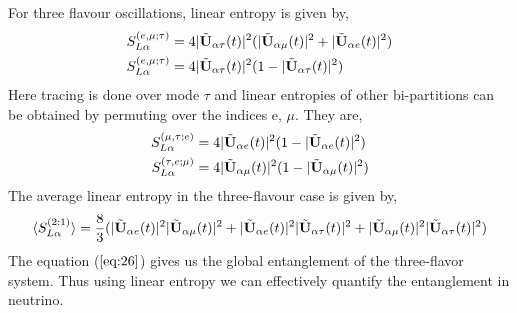 \documentclass[12pt,a4paper]{report}
\begin{document}
For three flavour oscillations, linear entropy is given by,
\begin{equation}
\begin{split}
S_{L\alpha}^{(e,\mu;\tau)}& = 4|\Tilde{\textbf{U}}_{\alpha \tau}(t)|^{2}(|\Tilde{\textbf{U}}_{\alpha \mu}(t)|^{2} + |\Tilde{\textbf{U}}_{\alpha e}(t)|^{2})\\
S_{L\alpha}^{(e,\mu;\tau)}&=  4|\Tilde{\textbf{U}}_{\alpha \tau}(t)|^{2}(1-|\Tilde{\textbf{U}}_{\alpha \tau}(t)|^{2})
\end{split}
\end{equation}
Here tracing is done over mode $\tau$ and linear entropies of other bi-partitions can be obtained by permuting over the indices e, $\mu$. They are, 
\begin{equation}
\begin{split}
S_{L\alpha}^{(\mu,\tau;e)}&=  4|\Tilde{\textbf{U}}_{\alpha e}(t)|^{2}(1-|\Tilde{\textbf{U}}_{\alpha e}(t)|^{2})\\
S_{L\alpha}^{(\tau,e;\mu)}&=  4|\Tilde{\textbf{U}}_{\alpha \mu}(t)|^{2}(1-|\Tilde{\textbf{U}}_{\alpha \mu}(t)|^{2})
\end{split}
\end{equation}
The average linear entropy in the three-flavour case is given by,
\begin{equation}
\label{eq:26}
    \langle S_{L\alpha}^{(2:1)}\rangle = \frac{8}{3}(|\Tilde{\textbf{U}}_{\alpha e}(t)|^{2}|\Tilde{\textbf{U}}_{\alpha \mu}(t)|^{2} + |\Tilde{\textbf{U}}_{\alpha e}(t)|^{2}|\Tilde{\textbf{U}}_{\alpha \tau}(t)|^{2} + |\Tilde{\textbf{U}}_{\alpha \mu}(t)|^{2}|\Tilde{\textbf{U}}_{\alpha \tau}(t)|^{2})
\end{equation}
The equation ($\ref{eq:26}$) gives us the global entanglement of the three-flavor system. Thus using linear entropy we can effectively quantify the entanglement in neutrino.


\newpage
\thispagestyle{empty}
\mbox{}
\newpage
\end{document}
